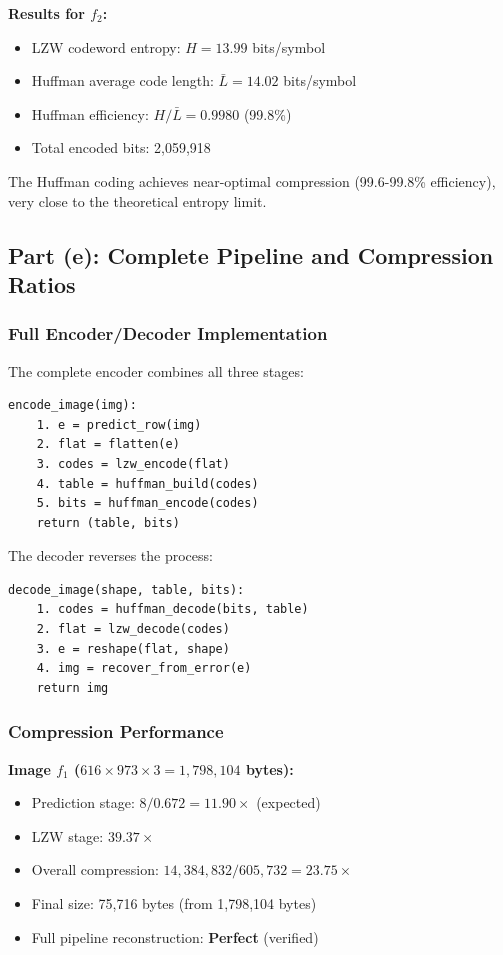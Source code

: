 \documentclass[11pt,a4paper]{article}
\begin{document}
\textbf{Results for $f_2$:}
\begin{itemize}
    \item LZW codeword entropy: $H = 13.99$ bits/symbol
    \item Huffman average code length: $\bar{L} = 14.02$ bits/symbol
    \item Huffman efficiency: $H/\bar{L} = 0.9980$ (99.8\%)
    \item Total encoded bits: 2,059,918
\end{itemize}

The Huffman coding achieves near-optimal compression (99.6-99.8\% efficiency), very close to the theoretical entropy limit.

\subsection{Part (e): Complete Pipeline and Compression Ratios}

\subsubsection{Full Encoder/Decoder Implementation}
The complete encoder combines all three stages:
\begin{verbatim}
encode_image(img):
    1. e = predict_row(img)           
    2. flat = flatten(e)               
    3. codes = lzw_encode(flat)        
    4. table = huffman_build(codes)    
    5. bits = huffman_encode(codes)    
    return (table, bits)
\end{verbatim}

The decoder reverses the process:
\begin{verbatim}
decode_image(shape, table, bits):
    1. codes = huffman_decode(bits, table)
    2. flat = lzw_decode(codes)
    3. e = reshape(flat, shape)
    4. img = recover_from_error(e)
    return img
\end{verbatim}

\subsubsection{Compression Performance}

\textbf{Image $f_1$ ($616 \times 973 \times 3 = 1,798,104$ bytes):}
\begin{itemize}
    \item Prediction stage: $8 / 0.672 = 11.90\times$ (expected)
    \item LZW stage: $39.37\times$
    \item Overall compression: $14,384,832 / 605,732 = \mathbf{23.75\times}$
    \item Final size: 75,716 bytes (from 1,798,104 bytes)
    \item Full pipeline reconstruction: \textbf{Perfect} (verified)
\end{itemize}
\end{document}
